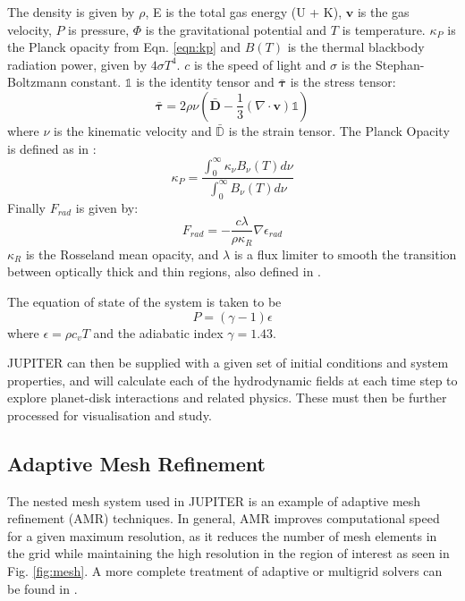 \documentclass[preprint2]{aastex62}
\begin{document}
The density is given by $\rho$, E is the total gas energy (U + K), $\mathbf{v}$ is the gas velocity, $P$ is pressure, $\Phi$ is the gravitational potential and $T$ is temperature. $\kappa_{P}$ is the Planck opacity from Eqn. \ref{eqn:kp} and $B(T)$ is the thermal blackbody radiation power, given by $4\sigma T^{4}$. $c$ is the speed of light and $\sigma$ is the Stephan-Boltzmann constant. $\mathds{1}$ is the identity tensor and $\bm{\bar{\tau}}$ is the stress tensor:
\begin{equation}
\bm{\bar{\tau}} = 2\rho\nu\left(\bm{\bar{D}} - \frac{1}{3}\left(\nabla\cdot\mathbf{v}\right)\mathds{1}\right)
\end{equation}
where $\nu$ is the kinematic velocity and $\mathds{\bar{D}}$ is the strain tensor. 
The Planck Opacity is defined as in \cite{Bitsch2013}:
\begin{equation}\label{eqn:kp}
\kappa_{P} = \frac{\int_{0}^{\infty}\kappa_{\nu}B_{\nu}\left(T\right)d\nu}{\int_{0}^{\infty}B_{\nu}\left(T\right)d\nu}
\end{equation}
Finally $F_{rad}$ is given by:
\begin{equation}
F_{rad} = -\frac{c\lambda}{\rho\kappa_{R}}\nabla\epsilon_{rad}
\end{equation}
$\kappa_{R}$ is the Rosseland mean opacity, and $\lambda$ is a flux limiter to smooth the transition between optically thick and thin regions, also defined in \cite{Bitsch2013}.

The equation of state of the system is taken to be 
\begin{equation}\label{eqn:eos}
P = \left(\gamma - 1\right)\epsilon
\end{equation}
where $\epsilon = \rho c_{v}T$ and the adiabatic index $\gamma = 1.43$.

JUPITER can then be supplied with a given set of initial conditions and system properties, and will calculate each of the hydrodynamic fields at each time step to explore planet-disk interactions and related physics. These must then be further processed for visualisation and study.
\subsection{Adaptive Mesh Refinement}\label{sec:amr}
The nested mesh system used in JUPITER is an example of adaptive mesh refinement (AMR) techniques. 
In general, AMR improves computational speed for a given maximum resolution, as it reduces the number of mesh elements in the grid while maintaining the high resolution in the region of interest as seen in Fig. \ref{fig:mesh}. A more complete treatment of adaptive or multigrid solvers can be found in \cite{hockney1988computer}. 
\end{document}
